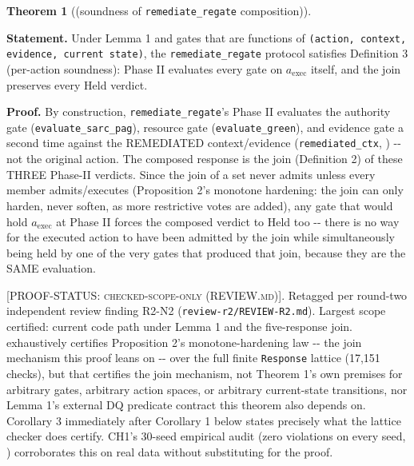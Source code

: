 \documentclass[11pt,a4paper]{article}
\theoremstyle{definition}
\newtheorem{theorem}{Theorem}
\newcommand{\proofstatus}[1]{[\textsc{PROOF-STATUS}: \textsc{#1}]}
\begin{document}
\begin{theorem}[(soundness of \texttt{remediate\_regate} composition)]
\label{thm:1}

\noindent\textbf{Statement.} Under Lemma 1 and gates that are functions of \texttt{(action, context, evidence, current state)}, the \texttt{remediate\_regate} protocol satisfies Definition 3 (per-action soundness): Phase II evaluates every gate on $a_{\mathrm{exec}}$ itself, and the join preserves every Held verdict.

\noindent\textbf{Proof.} By construction, \texttt{remediate\_regate}'s Phase II evaluates the authority gate (\texttt{evaluate\_sarc\_pag}), resource gate (\texttt{evaluate\_green}), and evidence gate a second time against the REMEDIATED context/evidence (\texttt{remediated\_ctx}, ) -{}- not the original action. The composed response is the join (Definition 2) of these THREE Phase-II verdicts. Since the join of a set never admits unless every member admits/executes (Proposition 2's monotone hardening: the join can only harden, never soften, as more restrictive votes are added), any gate that would hold $a_{\mathrm{exec}}$ at Phase II forces the composed verdict to Held too -{}- there is no way for the executed action to have been admitted by the join while simultaneously being held by one of the very gates that produced that join, because they are the SAME evaluation.

\proofstatus{checked-scope-only (REVIEW.md)}. Retagged per round-two independent review finding R2-N2 (\texttt{review-r2/REVIEW-R2.md}). Largest scope certified: current code path under Lemma 1 and the five-response join.  exhaustively certifies Proposition 2's monotone-hardening law -{}- the join mechanism this proof leans on -{}- over the full finite \texttt{Response} lattice (17,151 checks), but that certifies the join mechanism, not Theorem 1's own premises for arbitrary gates, arbitrary action spaces, or arbitrary current-state transitions, nor Lemma 1's external DQ predicate contract this theorem also depends on. Corollary 3 immediately after Corollary 1 below states precisely what the lattice checker does certify. CH1's 30-seed empirical audit (zero violations on every seed, ) corroborates this on real data without substituting for the proof.
\end{theorem}
\end{document}

